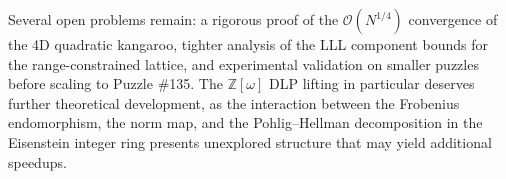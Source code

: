 \documentclass[11pt,a4paper]{article}
\theoremstyle{definition}
\newcommand{\Zomega}{\mathbb{Z}[\omega]}
\newcommand{\bigO}{\mathcal{O}}
\begin{document}
Several open problems remain: a rigorous proof of the $\bigO(N^{1/4})$ convergence of the 4D quadratic kangaroo, tighter analysis of the LLL component bounds for the range-constrained lattice, and experimental validation on smaller puzzles before scaling to Puzzle \#135. The $\Zomega$ DLP lifting in particular deserves further theoretical development, as the interaction between the Frobenius endomorphism, the norm map, and the Pohlig--Hellman decomposition in the Eisenstein integer ring presents unexplored structure that may yield additional speedups.


\end{document}
